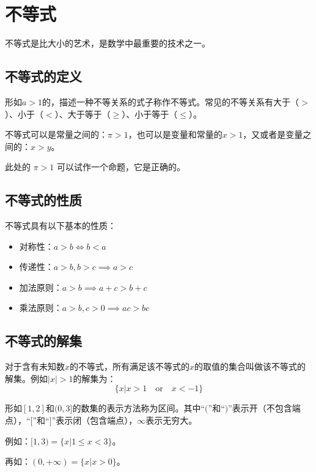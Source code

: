 \section{不等式}
不等式是比大小的艺术，是数学中最重要的技术之一。

\subsection{不等式的定义}
\begin{definition}[不等式]
    形如$a>1$的，描述一种不等关系的式子称作不等式。常见的不等关系有大于（$>$）、小于（$<$）、大于等于（$\geq$）、小于等于（$\leq$）。
\end{definition}

不等式可以是常量之间的：$\pi>1$，也可以是变量和常量的$x>1$，又或者是变量之间的：$x>y$。

\begin{tips}
此处的 $\pi > 1$ 可以试作一个命题，它是正确的。
\end{tips}

\subsection{不等式的性质}

不等式具有以下基本的性质：

\begin{itemize}
    \item 对称性：$a>b \iff b<a$
    \item 传递性：$a>b,b>c \implies a>c$
    \item 加法原则：$a>b \implies a+c>b+c$
    \item 乘法原则：$a>b, c>0 \implies ac>bc$
\end{itemize}

\subsection{不等式的解集}

\begin{definition}[解集]
    对于含有未知数$x$的不等式，所有满足该不等式的$x$的取值的集合叫做该不等式的解集。例如$|x|>1$的解集为：
    $$\{x|x>1 \quad \mathrm{or} \quad x<-1\}$$
\end{definition}

\begin{definition}[区间]
    形如$[1,2]$和$(0,3]$的数集的表示方法称为区间。其中“$($”和“$)$”表示开（不包含端点），“$[$”和“$]$”表示闭（包含端点），$\infty$表示无穷大。

    例如：$[1,3) = \{x|1\leq x< 3\}$。

    再如：$(0,+\infty) = \{x|x>0\}$。
\end{definition}